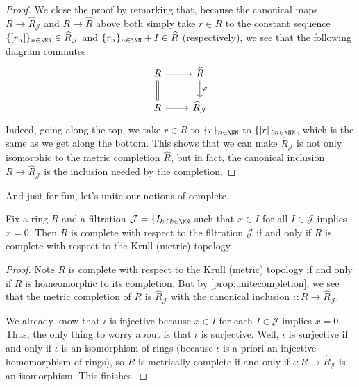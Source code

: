 \begin{proof}
	We close the proof by remarking that, because the canonical maps $R\to\widehat R_\mathcal J$ and $R\to\widehat R$ above both simply take $r\in R$ to the constant sequence $\{[r_n]\}_{n\in\NN}\in\widehat R_\mathcal J$ and $\{r_n\}_{n\in\NN}+I\in\widehat R$ (respectively), we see that the following diagram commutes.
	\[\begin{tikzcd}
		R & {\widehat R} \\
		R & {\widehat R_\mathcal J}
		\arrow[from=1-1, to=1-2]
		\arrow[from=2-1, to=2-2]
		\arrow["\varphi", from=1-2, to=2-2]
		\arrow[Rightarrow, no head, from=1-1, to=2-1]
	\end{tikzcd}\]
	Indeed, going along the top, we take $r\in R$ to $\{r\}_{n\in\NN}$ to $\{[r]\}_{n\in\NN}$, which is the same as we get along the bottom. This shows that we can make $\widehat R_\mathcal J$ is not only isomorphic to the metric completion $\widehat R$, but in fact, the canonical inclusion $R\to\widehat R_\mathcal J$ is the inclusion needed by the completion.
\end{proof}
And just for fun, let's unite our notions of complete.
\begin{corollary}
	Fix a ring $R$ and a filtration $\mathcal J=\{I_k\}_{k\in\NN}$ such that $x\in I$ for all $I\in\mathcal J$ implies $x=0$. Then $R$ is complete with respect to the filtration $\mathcal J$ if and only if $R$ is complete with respect to the Krull (metric) topology.
\end{corollary}
\begin{proof}
	Note $R$ is complete with respect to the Krull (metric) topology if and only if $R$ is homeomorphic to its completion. But by \autoref{prop:unitecompletion}, we see that the metric completion of $R$ is $\widehat R_\mathcal J$ with the canonical inclusion $\iota:R\to\widehat R_\mathcal J$.

	We already know that $\iota$ is injective because $x\in I$ for each $I\in\mathcal J$ implies $x=0$. Thus, the only thing to worry about is that $\iota$ is surjective. Well, $\iota$ is surjective if and only if $\iota$ is an isomorphism of rings (because $\iota$ is a priori an injective homomorphism of rings), so $R$ is metrically complete if and only if $\iota:R\to\widehat R_\mathcal J$ is an isomorphism. This finishes.
\end{proof}

